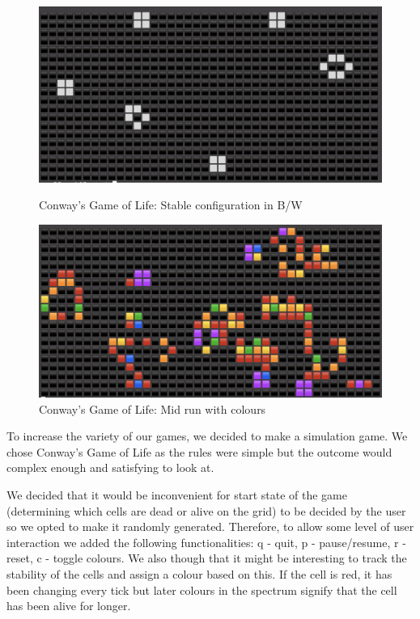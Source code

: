 \documentclass{article}
\begin{document}
\begin{figure}[h]
    \centering
    \begin{minipage}{0.45\textwidth}
        \centering
        \includegraphics[width=\textwidth]{conway1.png}
        \caption{Conway's Game of Life: Stable configuration in B/W}
        \label{fig:conway1}
    \end{minipage}\hfill
    \begin{minipage}{0.45\textwidth}
        \centering
        \includegraphics[width=\textwidth]{conway2.png} 
        \caption{Conway's Game of Life: Mid run with colours}
        \label{fig:conway2}
    \end{minipage}
\end{figure}

To increase the variety of our games, we decided to make a simulation game. We chose Conway's Game of Life as the rules were simple but the outcome would complex enough and satisfying to look at.

We decided that it would be inconvenient for start state of the game (determining which cells are dead or alive on the grid) to be decided by the user so we opted to make it randomly generated. Therefore, to allow some level of user interaction we added the following functionalities: q - quit, p - pause/resume, r - reset, c - toggle colours. We also though that it might be interesting to track the stability of the cells and assign a colour based on this. If the cell is red, it has been changing every tick but later colours in the spectrum signify that the cell has been alive for longer.
\end{document}
